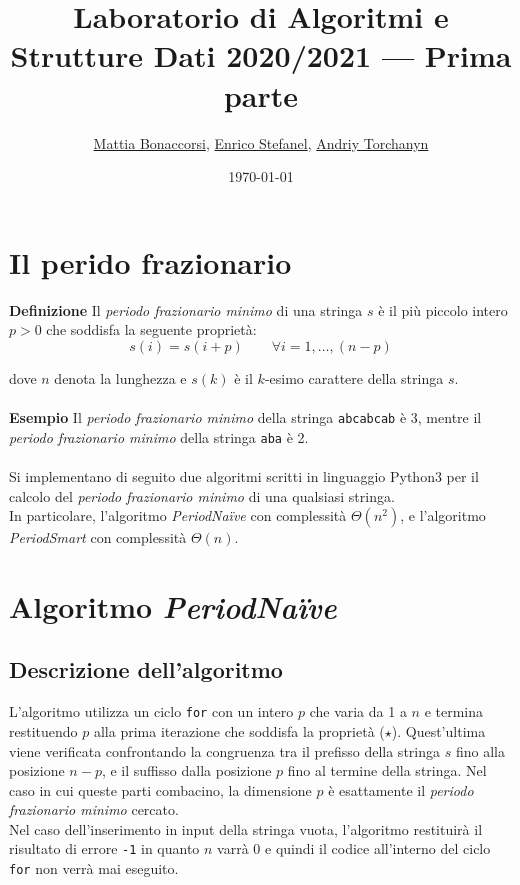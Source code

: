 \documentclass[11pt,a4paper]{article}
\title{\textbf{Laboratorio di Algoritmi e Strutture Dati 2020/2021} --- Prima parte}
\date{\today}
\author{\href{mailto:bonaccorsi.mattia@spes.uniud.it}{Mattia Bonaccorsi}, \href{mailto:stefanel.enrico@spes.uniud.it}{Enrico Stefanel}, \href{mailto:torchanyn.andriy@spes.uniud.it}{Andriy Torchanyn}}
\begin{document}
\maketitle

\section{Il perido frazionario}
\textbf{Definizione} Il \textit{periodo frazionario minimo} di una stringa $s$ è il più piccolo intero $p>0$ che soddisfa la seguente
proprietà:
\begin{equation}
s(i) = s(i+p)\qquad \forall i = 1, \dots , (n-p) \tag{$\star$}
\end{equation}

dove $n$ denota la lunghezza e $s(k)$ è il $k$-esimo carattere della stringa $s$.\\
\\
\textbf{Esempio} Il \emph{periodo frazionario minimo} della stringa \texttt{abcabcab} è 3, mentre il \emph{periodo frazionario minimo} della stringa \texttt{aba} è 2.\\
\\
Si implementano di seguito due algoritmi scritti in linguaggio Python3 per il calcolo del \emph{periodo frazionario minimo} di una qualsiasi stringa.\\
In particolare, l'algoritmo \textit{PeriodNa{\"i}ve} con complessità $\Theta(n^2)$, e l'algoritmo \textit{PeriodSmart} con complessità $\Theta(n)$.



\section{Algoritmo \textit{PeriodNa{\"i}ve}}

\subsection{Descrizione dell'algoritmo}
L'algoritmo utilizza un ciclo \texttt{for}  con un intero $p$ che varia da 1 a $n$ e termina restituendo $p$ alla prima iterazione che soddisfa la proprietà ($\star$). Quest'ultima viene verificata confrontando la congruenza tra il prefisso della stringa $s$ fino alla posizione $n-p$, e il suffisso dalla posizione $p$ fino al termine della stringa. Nel caso in cui queste parti combacino, la dimensione $p$ è esattamente il \textit{periodo frazionario minimo} cercato.\\
Nel caso dell'inserimento in input della stringa vuota, l'algoritmo restituirà il risultato di errore \texttt{-1} in quanto $n$ varrà 0 e quindi il codice all'interno del ciclo \texttt{for} non verrà mai eseguito.
\end{document}
